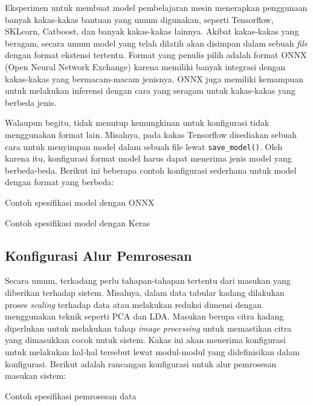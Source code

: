 Eksperimen untuk membuat model pembelajaran mesin menerapkan penggunaan banyak kakas-kakas bantuan yang umum digunakan, seperti Tensorflow, SKLearn, Catboost, dan banyak kakas-kakas lainnya.
Akibat kakas-kakas yang beragam, secara umum model yang telah dilatih akan disimpan dalam sebuah \textit{file} dengan format ekstensi tertentu.
Format yang penulis pilih adalah format ONNX (Open Neural Network Exchange) karena memiliki banyak integrasi dengan kakas-kakas yang bermacam-macam jenisnya.
ONNX juga memiliki kemampuan untuk melakukan inferensi dengan cara yang seragam untuk kakas-kakas yang berbeda jenis.

Walaupun begitu, tidak menutup kemungkinan untuk konfigurasi tidak menggunakan format lain.
Misalnya, pada kakas Tensorflow disediakan sebuah cara untuk menyimpan model dalam sebuah file lewat \texttt{save_model()}.
Oleh karena itu, konfigurasi format model harus dapat menerima jenis model yang berbeda-beda.
Berikut ini beberapa contoh konfigurasi sederhana untuk model dengan format yang berbeda:

\begin{listing}[H]
	\caption{Contoh spesifikasi model dengan ONNX}
	\label{listing:5}
\end{listing}
\begin{listing}[H]
	\caption{Contoh spesifikasi model dengan Keras}
	\label{listing:6}
\end{listing}

\subsection{Konfigurasi Alur Pemrosesan}\label{section:03-processing-pipeline}
Secara umum, terkadang perlu tahapan-tahapan tertentu dari masukan yang diberikan terhadap sistem.
Misalnya, dalam data tabular kadang dilakukan proses \textit{scaling} terhadap data atau melakukan reduksi dimensi dengan menggunakan teknik seperti PCA dan LDA.
Masukan berupa citra kadang diperlukan untuk melakukan tahap \textit{image processing} untuk memastikan citra yang dimasukkan cocok untuk sistem.
Kakas ini akan menerima konfigurasi untuk melakukan hal-hal tersebut lewat modul-modul yang didefinisikan dalam konfigurasi.
Berikut adalah rancangan konfigurasi untuk alur pemrosesan masukan sistem:

\begin{listing}[H]
	\caption{Contoh spesifikasi pemrosesan data}
	\label{listing:7}
\end{listing}

